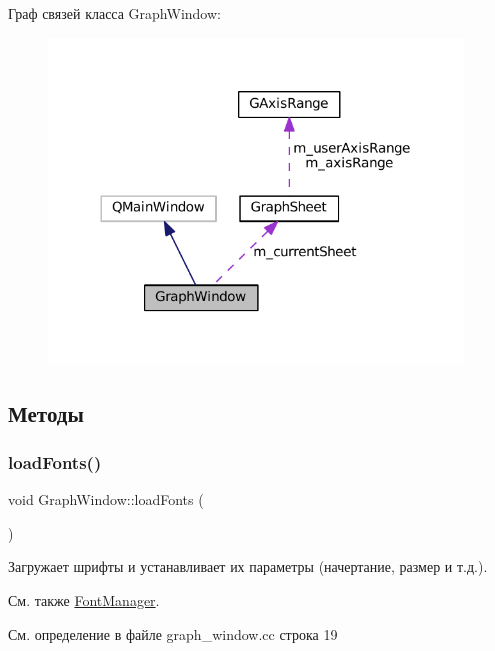 Граф связей класса Graph\+Window\+:
\nopagebreak
\begin{figure}[H]
\begin{center}
\leavevmode
\includegraphics[width=312pt]{class_graph_window__coll__graph}
\end{center}
\end{figure}


\subsection{Методы}
\hypertarget{class_graph_window_ad4d4842869a043556a275ba06acd816b}{}\label{class_graph_window_ad4d4842869a043556a275ba06acd816b} 
\subsubsection{\texorpdfstring{load\+Fonts()}{loadFonts()}}
{\footnotesize\ttfamily void Graph\+Window\+::load\+Fonts (\begin{DoxyParamCaption}{ }\end{DoxyParamCaption})\hspace{0.3cm}{\ttfamily [private]}}



Загружает шрифты и устанавливает их параметры (начертание, размер и т.\+д.). 

\begin{DoxySeeAlso}{См. также}
\hyperlink{class_font_manager}{Font\+Manager}. 
\end{DoxySeeAlso}


См. определение в файле graph\+\_\+window.\+cc строка 19

